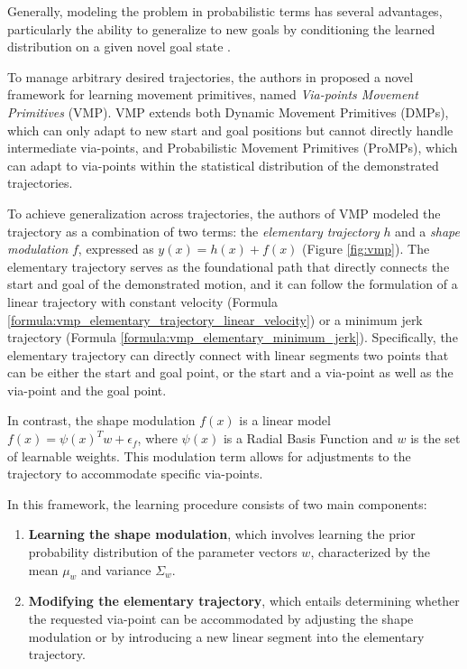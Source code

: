 Generally, modeling the problem in probabilistic terms has several advantages, particularly the ability to generalize to new goals by conditioning the learned distribution on a given novel goal state \cite{saveriano2023dynamic}.

To manage arbitrary desired trajectories, the authors in \cite{zhou2019learning} proposed a novel framework for learning movement primitives, named \textit{Via-points Movement Primitives} (VMP). VMP extends both Dynamic Movement Primitives (DMPs), which can only adapt to new start and goal positions but cannot directly handle intermediate via-points, and Probabilistic Movement Primitives (ProMPs), which can adapt to via-points within the statistical distribution of the demonstrated trajectories.

To achieve generalization across trajectories, the authors of VMP modeled the trajectory as a combination of two terms: the \textit{elementary trajectory} $h$ and a \textit{shape modulation} $f$, expressed as $y(x) = h(x) + f(x)$ (Figure \ref{fig:vmp}). The elementary trajectory serves as the foundational path that directly connects the start and goal of the demonstrated motion, and it can follow the formulation of a linear trajectory with constant velocity (Formula \ref{formula:vmp_elementary_trajectory_linear_velocity}) or a minimum jerk trajectory (Formula \ref{formula:vmp_elementary_minimum_jerk}). Specifically, the elementary trajectory can directly connect with linear segments two points that can be either the start and goal point, or the start and a via-point as well as the via-point and the goal point.

In contrast, the shape modulation $f(x)$ is a linear model $f(x) = \psi(x)^T w + \epsilon_f$, where $\psi(x)$ is a Radial Basis Function and $w$ is the set of learnable weights. This modulation term allows for adjustments to the trajectory to accommodate specific via-points.


In this framework, the learning procedure consists of two main components:
\begin{enumerate}
    \item \textbf{Learning the shape modulation}, which involves learning the prior probability distribution of the parameter vectors \( w \), characterized by the mean \( \mu_{w} \) and variance \( \Sigma_{w} \).
    \item \textbf{Modifying the elementary trajectory}, which entails determining whether the requested via-point can be accommodated by adjusting the shape modulation or by introducing a new linear segment into the elementary trajectory.
\end{enumerate}

